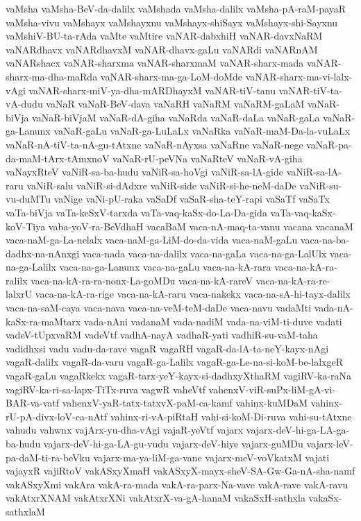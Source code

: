 {vaMsha
vaMsha-BeV-da-dalilx
vaMshada
vaMsha-dalilx
vaMsha-pA-raM-payaR
vaMsha-vivu
vaMshayx
vaMshayxnu
vaMshayx-shiSayx
vaMshayx-shi-Sayxnu
vaMshiV-BU-ta-rAda
vaMte
vaMtire
vaNAR-dabxhiH
vaNAR-davxNaRM
vaNARdhavx
vaNARdhavxM
vaNAR-dhavx-gaLu
vaNARdi
vaNARnAM
vaNARshacx
vaNAR-sharxma
vaNAR-sharxmaM
vaNAR-sharx-mada
vaNAR-sharx-ma-dha-maRda
vaNAR-sharx-ma-ga-LoM-doMde
vaNAR-sharx-ma-vi-lalx-vAgi
vaNAR-sharx-miV-ya-dha-mARDhayxM
vaNAR-tiV-tanu
vaNAR-tiV-ta-vA-dudu
vaNaR
vaNaR-BeV-dava
vaNaRH
vaNaRM
vaNaRM-gaLaM
vaNaR-biVja
vaNaR-biVjaM
vaNaR-dA-giha
vaNaRda
vaNaR-daLa
vaNaR-gaLa
vaNaR-ga-Lanunx
vaNaR-gaLu
vaNaR-ga-LuLaLx
vaNaRka
vaNaR-maM-Da-la-vuLaLx
vaNaR-nA-tiV-ta-nA-gu-tAtxne
vaNaR-nAyxsa
vaNaRne
vaNaR-nege
vaNaR-pa-da-maM-tArx-tAmxnoV
vaNaR-rU-peVNa
vaNaRteV
vaNaR-vA-giha
vaNayxRteV
vaNiR-sa-ba-hudu
vaNiR-sa-hoVgi
vaNiR-sa-lA-gide
vaNiR-sa-lA-raru
vaNiR-salu
vaNiR-si-dAdxre
vaNiR-side
vaNiR-si-he-neM-daDe
vaNiR-su-vu-duMTu
vaNige
vaNi-pU-raka
vaSaDf
vaSaR-sha-teY-rapi
vaSaTf
vaSaTx
vaTa-biVja
vaTa-keSxV-tarxda
vaTa-vaq-kaSx-do-La-Da-gida
vaTa-vaq-kaSx-koV-Tiya
vaba-yoV-ra-BeVdhaH
vacaBaM
vaca-nA-maq-ta-vanu
vacana
vacanaM
vaca-naM-ga-La-nelalx
vaca-naM-ga-LiM-do-da-vida
vaca-naM-gaLu
vaca-na-ba-dadhx-na-nAnxgi
vaca-nada
vaca-na-dalilx
vaca-na-gaLa
vaca-na-ga-LalUlx
vaca-na-ga-Lalilx
vaca-na-ga-Lanunx
vaca-na-gaLu
vaca-na-kA-rara
vaca-na-kA-ra-ralilx
vaca-na-kA-ra-ra-nonx-La-goMDu
vaca-na-kA-rareV
vaca-na-kA-ra-re-lalxrU
vaca-na-kA-ra-rige
vaca-na-kA-raru
vaca-nakekx
vaca-na-sA-hi-tayx-dalilx
vaca-na-saM-caya
vaca-nava
vaca-na-veM-teM-daDe
vaca-navu
vadaMti
vada-nA-kaSx-ra-maMtarx
vada-nAni
vadanaM
vada-nadiM
vada-na-viM-ti-duve
vadati
vadeV-tUpxvaRM
vadeVtf
vadhA-nayA
vadhaR-yati
vadhiR-su-vaM-taha
vadidhxsi
vadu
vadu-da-rave
vagaR
vagaRH
vagaR-da-lA-ta-neY-kayx-nAgi
vagaR-dalilx
vagaR-da-varu
vagaR-ga-Lalilx
vagaR-ga-Le-na-si-koM-be-lalxgeR
vagaR-gaLu
vagaRkekx
vagaR-tarx-yeY-kayx-si-dadhxyXthaRM
vagiRV-ka-raNa
vagiRV-ka-ri-sa-lapx-TiTx-ruva
vagwR
vaheVtf
vahenxV-viR-suPx-liM-gA-vi-BAR-va-vatf
vahenxV-yaR-tatx-tatxvX-paM-ca-kamf
vahinx-kuMDaM
vahinx-rU-pA-divx-loV-ca-nAtf
vahinx-ri-vA-piRtaH
vahi-si-koM-Di-ruva
vahi-su-tAtxne
vahudu
vahwnx
vajArx-yu-dha-vAgi
vajaR-yeVtf
vajarx
vajarx-deV-hi-ga-LA-ga-ba-hudu
vajarx-deV-hi-ga-LA-gu-vudu
vajarx-deV-hiye
vajarx-guMDu
vajarx-leV-pa-daM-ti-ra-beVku
vajarx-ma-ya-liM-ga-vane
vajarx-meV-voVkatxM
vajati
vajayxR
vajiRtoV
vakASxyXmaH
vakASxyX-mayx-sheV-SA-Gw-Ga-nA-sha-namf
vakASxyXmi
vakAra
vakA-ra-mada
vakA-ra-parx-Na-vave
vakA-rave
vakA-ravu
vakAtxrXNAM
vakAtxrXNi
vakAtxrX-va-gA-hanaM
vakaSxH-sathxla
vakaSx-sathxlaM
}
